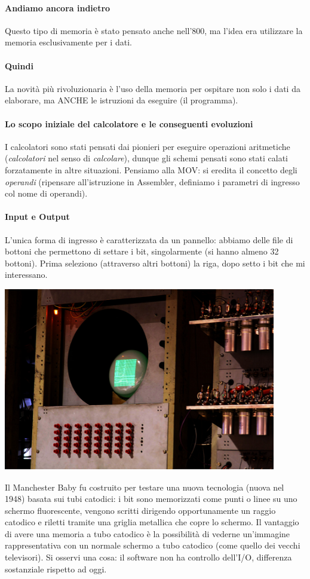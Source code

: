 \paragraph{Andiamo ancora indietro} Questo tipo di memoria è stato pensato anche nell'800, ma l'idea era utilizzare la memoria esclusivamente per i dati.
\paragraph{Quindi} La novità più rivoluzionaria è l'uso della memoria per ospitare non solo i dati da elaborare, ma ANCHE le istruzioni da eseguire  (il programma).
\paragraph{Lo scopo iniziale del calcolatore e le conseguenti evoluzioni} I calcolatori sono stati pensati dai pionieri per eseguire operazioni aritmetiche (\emph{calcolatori} nel senso di \emph{calcolare}), dunque gli schemi pensati sono stati calati forzatamente in altre situazioni. Pensiamo alla MOV: si eredita il concetto degli \emph{operandi} (ripensare all'istruzione in Assembler, definiamo i parametri di ingresso col nome di operandi).

\paragraph{Input e Output} L'unica forma di ingresso è caratterizzata da un pannello: abbiamo delle file di bottoni che permettono di settare i bit, singolarmente (si hanno almeno 32 bottoni). Prima seleziono (attraverso altri bottoni) la riga, dopo setto i bit che mi interessano.
\begin{center}
	\includegraphics{img/3.PNG}
\end{center}
Il Manchester Baby fu costruito per testare una nuova tecnologia (nuova nel 1948) basata sui tubi catodici: i bit sono memorizzati come punti o linee su uno schermo fluorescente, vengono scritti dirigendo opportunamente un raggio catodico e riletti tramite una griglia metallica che copre lo schermo. Il vantaggio di avere una memoria a tubo catodico è la possibilità di vederne un'immagine rappresentativa con un normale schermo a tubo catodico (come quello dei vecchi televisori). Si osservi una cosa: il software non ha controllo dell'I/O, differenza sostanziale rispetto ad oggi.

